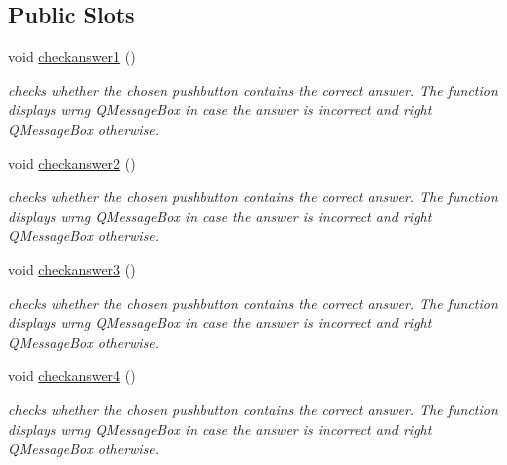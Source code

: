 \subsection*{Public Slots}
\begin{DoxyCompactItemize}
\item 
\mbox{\label{classquests_a2fd07763aff26aae5036acb169719fff}} 
void \hyperlink{classquests_a2fd07763aff26aae5036acb169719fff}{checkanswer1} ()
\begin{DoxyCompactList}\small\item\em checks whether the chosen pushbutton contains the correct answer. The function displays wrng Q\+Message\+Box in case the answer is incorrect and right Q\+Message\+Box otherwise. \end{DoxyCompactList}\item 
\mbox{\label{classquests_aff4a72bbc6183f358be72359f576ffed}} 
void \hyperlink{classquests_aff4a72bbc6183f358be72359f576ffed}{checkanswer2} ()
\begin{DoxyCompactList}\small\item\em checks whether the chosen pushbutton contains the correct answer. The function displays wrng Q\+Message\+Box in case the answer is incorrect and right Q\+Message\+Box otherwise. \end{DoxyCompactList}\item 
\mbox{\label{classquests_aa40aba6d49a76ce0f3110046b0c0f72e}} 
void \hyperlink{classquests_aa40aba6d49a76ce0f3110046b0c0f72e}{checkanswer3} ()
\begin{DoxyCompactList}\small\item\em checks whether the chosen pushbutton contains the correct answer. The function displays wrng Q\+Message\+Box in case the answer is incorrect and right Q\+Message\+Box otherwise. \end{DoxyCompactList}\item 
\mbox{\label{classquests_a4b75d0858f37450128457d565afe4411}} 
void \hyperlink{classquests_a4b75d0858f37450128457d565afe4411}{checkanswer4} ()
\begin{DoxyCompactList}\small\item\em checks whether the chosen pushbutton contains the correct answer. The function displays wrng Q\+Message\+Box in case the answer is incorrect and right Q\+Message\+Box otherwise. \end{DoxyCompactList}\end{DoxyCompactItemize}
